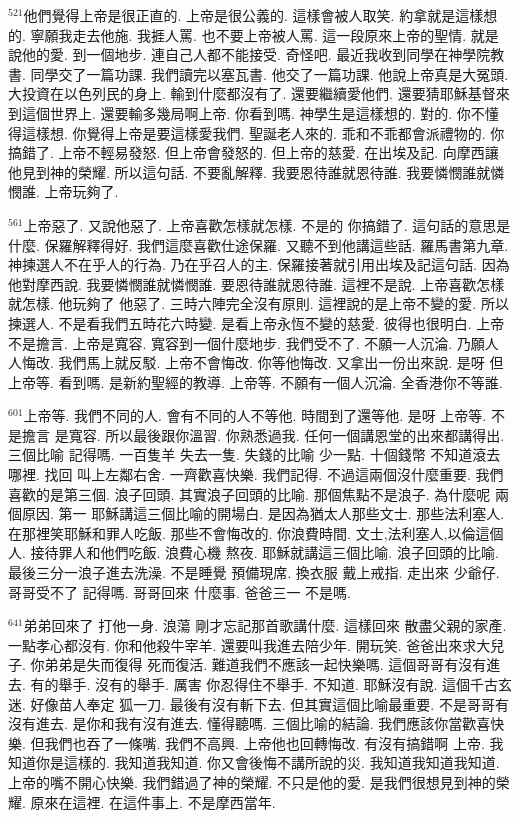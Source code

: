 \documentclass{book}
\begin{document}
$^{521}$他們覺得上帝是很正直的.
上帝是很公義的.
這樣會被人取笑.
約拿就是這樣想的.
寧願我走去他施.
我捱人罵.
也不要上帝被人罵.
這一段原來上帝的聖情.
就是說他的愛.
到一個地步.
連自己人都不能接受.
奇怪吧.
最近我收到同學在神學院教書.
同學交了一篇功課.
我們讀完以塞瓦書.
他交了一篇功課.
他說上帝真是大冤頭.
大投資在以色列民的身上.
輸到什麼都沒有了.
還要繼續愛他們.
還要猜耶穌基督來到這個世界上.
還要輸多幾局啊上帝.
你看到嗎.
神學生是這樣想的.
對的.
你不懂得這樣想.
你覺得上帝是要這樣愛我們.
聖誕老人來的.
乖和不乖都會派禮物的.
你搞錯了.
上帝不輕易發怒.
但上帝會發怒的.
但上帝的慈愛.
在出埃及記.
向摩西讓他見到神的榮耀.
所以這句話.
不要亂解釋.
我要恩待誰就恩待誰.
我要憐憫誰就憐憫誰.
上帝玩夠了.

$^{561}$上帝惡了.
又說他惡了.
上帝喜歡怎樣就怎樣.
不是的 你搞錯了.
這句話的意思是什麼.
保羅解釋得好.
我們這麼喜歡仕途保羅.
又聽不到他講這些話.
羅馬書第九章.
神揀選人不在乎人的行為.
乃在乎召人的主.
保羅接著就引用出埃及記這句話.
因為他對摩西說.
我要憐憫誰就憐憫誰.
要恩待誰就恩待誰.
這裡不是說.
上帝喜歡怎樣就怎樣.
他玩夠了 他惡了.
三時六陣完全沒有原則.
這裡說的是上帝不變的愛.
所以揀選人.
不是看我們五時花六時變.
是看上帝永恆不變的慈愛.
彼得也很明白.
上帝不是擔言.
上帝是寬容.
寬容到一個什麼地步.
我們受不了.
不願一人沉淪.
乃願人人悔改.
我們馬上就反駁.
上帝不會悔改.
你等他悔改.
又拿出一份出來說.
是呀 但上帝等.
看到嗎.
是新約聖經的教導.
上帝等.
不願有一個人沉淪.
全香港你不等誰.

$^{601}$上帝等.
我們不同的人.
會有不同的人不等他.
時間到了還等他.
是呀 上帝等.
不是擔言 是寬容.
所以最後跟你溫習.
你熟悉過我.
任何一個講恩堂的出來都講得出.
三個比喻 記得嗎.
一百隻羊 失去一隻.
失錢的比喻 少一點.
十個錢幣 不知道滾去哪裡.
找回 叫上左鄰右舍.
一齊歡喜快樂.
我們記得.
不過這兩個沒什麼重要.
我們喜歡的是第三個.
浪子回頭.
其實浪子回頭的比喻.
那個焦點不是浪子.
為什麼呢 兩個原因.
第一 耶穌講這三個比喻的開場白.
是因為猶太人那些文士.
那些法利塞人.
在那裡笑耶穌和罪人吃飯.
那些不會悔改的.
你浪費時間.
文士,法利塞人,以倫這個人.
接待罪人和他們吃飯.
浪費心機 熬夜.
耶穌就講這三個比喻.
浪子回頭的比喻.
最後三分一浪子進去洗澡.
不是睡覺 預備現席.
換衣服 戴上戒指.
走出來 少爺仔.
哥哥受不了 記得嗎.
哥哥回來 什麼事.
爸爸三一 不是嗎.

$^{641}$弟弟回來了 打他一身.
浪蕩 剛才忘記那首歌講什麼.
這樣回來 散盡父親的家產.
一點孝心都沒有.
你和他殺牛宰羊.
還要叫我進去陪少年.
開玩笑.
爸爸出來求大兒子.
你弟弟是失而復得 死而復活.
難道我們不應該一起快樂嗎.
這個哥哥有沒有進去.
有的舉手.
沒有的舉手.
厲害 你忍得住不舉手.
不知道.
耶穌沒有說.
這個千古玄迷.
好像苗人奉定 狐一刀.
最後有沒有斬下去.
但其實這個比喻最重要.
不是哥哥有沒有進去.
是你和我有沒有進去.
懂得聽嗎.
三個比喻的結論.
我們應該你當歡喜快樂.
但我們也吞了一條嘴.
我們不高興.
上帝他也回轉悔改.
有沒有搞錯啊 上帝.
我知道你是這樣的.
我知道我知道.
你又會後悔不講所說的災.
我知道我知道我知道.
上帝的嘴不開心快樂.
我們錯過了神的榮耀.
不只是他的愛.
是我們很想見到神的榮耀.
原來在這裡.
在這件事上.
不是摩西當年.
\end{document}

